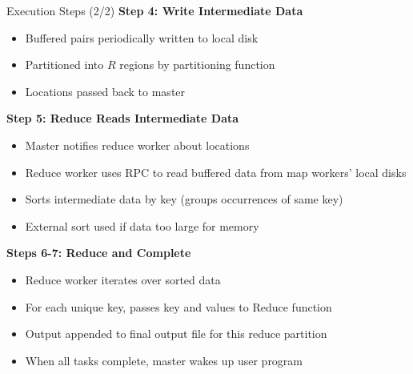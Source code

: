 \documentclass[aspectratio=169]{beamer}
\begin{document}
\begin{frame}{Execution Steps (2/2)}
\textbf{Step 4: Write Intermediate Data}
\begin{itemize}
    \item Buffered pairs periodically written to local disk
    \item Partitioned into $R$ regions by partitioning function
    \item Locations passed back to master
\end{itemize}

\vspace{0.2cm}

\textbf{Step 5: Reduce Reads Intermediate Data}
\begin{itemize}
    \item Master notifies reduce worker about locations
    \item Reduce worker uses RPC to read buffered data from map workers' local disks
    \item Sorts intermediate data by key (groups occurrences of same key)
    \item External sort used if data too large for memory
\end{itemize}

\vspace{0.2cm}

\textbf{Steps 6-7: Reduce and Complete}
\begin{itemize}
    \item Reduce worker iterates over sorted data
    \item For each unique key, passes key and values to Reduce function
    \item Output appended to final output file for this reduce partition
    \item When all tasks complete, master wakes up user program
\end{itemize}
\end{frame}
\end{document}
